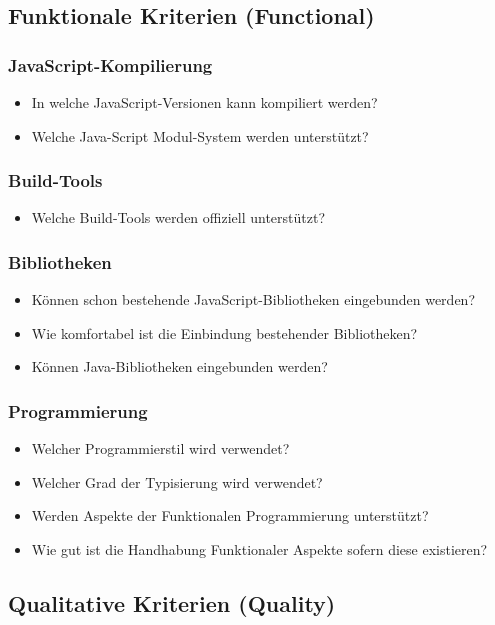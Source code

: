 \subsection{Funktionale Kriterien (Functional)}
\subsubsection{JavaScript-Kompilierung}
\begin{itemize}
	\item In welche JavaScript-Versionen kann kompiliert werden?
	\item Welche Java-Script Modul-System werden unterstützt?
\end{itemize}

\subsubsection{Build-Tools}
\begin{itemize}
	\item Welche Build-Tools werden offiziell unterstützt?
\end{itemize}

\subsubsection{Bibliotheken}
\begin{itemize}
	\item Können schon bestehende JavaScript-Bibliotheken eingebunden werden?
	\item Wie komfortabel ist die Einbindung bestehender Bibliotheken?
	\item Können Java-Bibliotheken eingebunden werden?
\end{itemize}

\subsubsection{Programmierung}
\begin{itemize}
	\item Welcher Programmierstil wird verwendet?
	\item Welcher Grad der Typisierung wird verwendet?
	\item Werden Aspekte der Funktionalen Programmierung unterstützt?
	\item Wie gut ist die Handhabung Funktionaler Aspekte sofern diese existieren?
\end{itemize}

\subsection{Qualitative Kriterien (Quality)}
